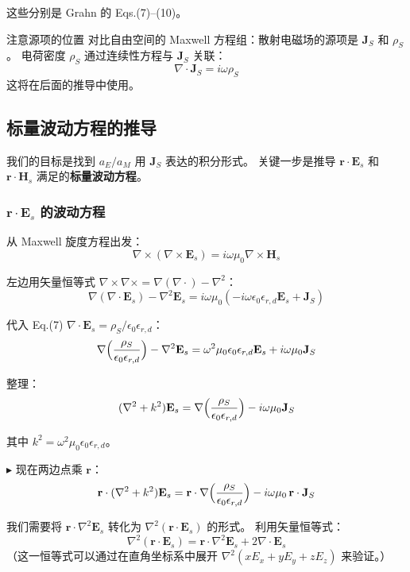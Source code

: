 这些分别是 Grahn 的 Eqs.(7)--(10)。

\begin{stepbox}{注意源项的位置}
对比自由空间的 Maxwell 方程组：散射电磁场的源项是 $\mathbf{J}_S$ 和 $\rho_S$。
电荷密度 $\rho_S$ 通过连续性方程与 $\mathbf{J}_S$ 关联：
$$
\nabla\cdot\mathbf{J}_S = i\omega\rho_S
$$
这将在后面的推导中使用。
\end{stepbox}

\subsection{标量波动方程的推导}

我们的目标是找到 $a_E/a_M$ 用 $\mathbf{J}_S$ 表达的积分形式。
关键一步是推导 $\mathbf{r}\cdot\mathbf{E}_s$ 和 $\mathbf{r}\cdot\mathbf{H}_s$ 满足的\textbf{标量波动方程}。

\subsubsection{$\mathbf{r}\cdot\mathbf{E}_s$ 的波动方程}

从 Maxwell 旋度方程出发：
$$
\nabla\times(\nabla\times\mathbf{E}_s) = i\omega\mu_0\nabla\times\mathbf{H}_s
$$

左边用矢量恒等式 $\nabla\times\nabla\times = \nabla(\nabla\cdot) - \nabla^2$：
$$
\nabla(\nabla\cdot\mathbf{E}_s) - \nabla^2\mathbf{E}_s = i\omega\mu_0(-i\omega\epsilon_0\epsilon_{r,d}\mathbf{E}_s + \mathbf{J}_S)
$$

代入 Eq.(7) $\nabla\cdot\mathbf{E}_s = \rho_S/\epsilon_0\epsilon_{r,d}$：
$$
\nabla\Bigl(\frac{\rho_S}{\epsilon_0\epsilon_{r,d}}\Bigr) - \nabla^2\mathbf{E}_s
= \omega^2\mu_0\epsilon_0\epsilon_{r,d}\mathbf{E}_s + i\omega\mu_0\mathbf{J}_S
$$

整理：
\begin{equation}
  (\nabla^2 + k^2)\mathbf{E}_s = \nabla\Bigl(\frac{\rho_S}{\epsilon_0\epsilon_{r,d}}\Bigr) - i\omega\mu_0\mathbf{J}_S
  \label{eq:helmholtz_E}
\end{equation}

其中 $k^2 = \omega^2\mu_0\epsilon_0\epsilon_{r,d}$。

$\blacktriangleright$ 现在两边点乘 $\mathbf{r}$：
$$
\mathbf{r}\cdot(\nabla^2 + k^2)\mathbf{E}_s = \mathbf{r}\cdot\nabla\Bigl(\frac{\rho_S}{\epsilon_0\epsilon_{r,d}}\Bigr) - i\omega\mu_0\,\mathbf{r}\cdot\mathbf{J}_S
$$

我们需要将 $\mathbf{r}\cdot\nabla^2\mathbf{E}_s$ 转化为 $\nabla^2(\mathbf{r}\cdot\mathbf{E}_s)$ 的形式。
利用矢量恒等式：
$$
\nabla^2(\mathbf{r}\cdot\mathbf{E}_s) = \mathbf{r}\cdot\nabla^2\mathbf{E}_s + 2\nabla\cdot\mathbf{E}_s
$$
（这一恒等式可以通过在直角坐标系中展开 $\nabla^2(xE_x+yE_y+zE_z)$ 来验证。）

